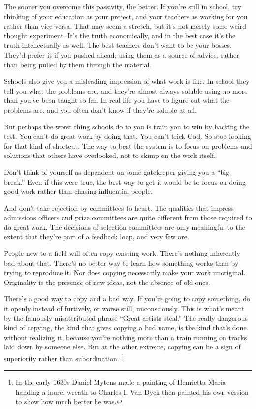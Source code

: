 \documentclass[12pt]{book}
\begin{document}
The sooner you overcome this passivity, the better. If you're still in
school, try thinking of your education as your project, and your
teachers as working for you rather than vice versa. That may seem a
stretch, but it's not merely some weird thought experiment. It's the
truth economically, and in the best case it's the truth intellectually
as well. The best teachers don't want to be your bosses. They'd prefer
it if you pushed ahead, using them as a source of advice, rather than
being pulled by them through the material.

Schools also give you a misleading impression of what work is like. In
school they tell you what the problems are, and they're almost always
soluble using no more than you've been taught so far. In real life you
have to figure out what the problems are, and you often don't know if
they're soluble at all.

But perhaps the worst thing schools do to you is train you to win by
hacking the test. You can't do great work by doing that. You can't trick
God. So stop looking for that kind of shortcut. The way to beat the
system is to focus on problems and solutions that others have
overlooked, not to skimp on the work itself.

Don't think of yourself as dependent on some gatekeeper giving you a
``big break.'' Even if this were true, the best way to get it would be
to focus on doing good work rather than chasing influential people.

And don't take rejection by committees to heart. The qualities that
impress admissions officers and prize committees are quite different
from those required to do great work. The decisions of selection
committees are only meaningful to the extent that they're part of a
feedback loop, and very few are.

People new to a field will often copy existing work. There's nothing
inherently bad about that. There's no better way to learn how something
works than by trying to reproduce it. Nor does copying necessarily make
your work unoriginal. Originality is the presence of new ideas, not the
absence of old ones.

There's a good way to copy and a bad way. If you're going to copy
something, do it openly instead of furtively, or worse still,
unconsciously. This is what's meant by the famously misattributed phrase
``Great artists steal.'' The really dangerous kind of copying, the kind
that gives copying a bad name, is the kind that's done without realizing
it, because you're nothing more than a train running on tracks laid down
by someone else. But at the other extreme, copying can be a sign of
superiority rather than subordination. \footnote{In the early 1630s Daniel Mytens made a painting of Henrietta
Maria handing a laurel wreath to Charles I. Van Dyck then painted his
own version to show how much better he was.}
\end{document}

